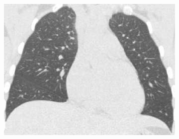 {\begin{figure}[htbp]
\begin{subfigure}{.32\linewidth}
  \includegraphics[width=\linewidth,trim={{.0\wd0} {.0\wd0} {.0\wd0} {.0\wd0}},clip]{Segmentation/Image/H1335_FRC_Raw_Coronal.png}
  \caption{}
  \label{fig:HLASegmentationResults-g} 
\end{subfigure}
\begin{subfigure}{.32\linewidth}%

\end{subfigure}
\end{figure}}
